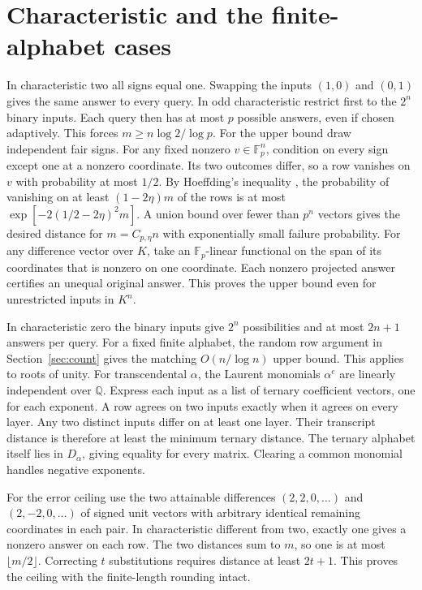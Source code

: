 \documentclass[11pt,letterpaper]{article}
\numberwithin{equation}{section}
\begin{document}
\section{Characteristic and the finite-alphabet cases}\label{sec:elementary}

In characteristic two all signs equal one. Swapping the inputs $(1,0)$ and $(0,1)$ gives the
same answer to every query. In odd characteristic restrict first to the $2^n$ binary inputs.
Each query then has at most $p$ possible answers, even if chosen adaptively. This forces $m\ge
n\log 2/\log p$. For the upper bound draw independent fair signs. For any fixed nonzero
$v\in\mathbb F_p^n$, condition on every sign except one at a nonzero coordinate. Its two
outcomes differ, so a row vanishes on $v$ with probability at most $1/2$. By Hoeffding's
inequality \cite{hoeffding}, the probability of vanishing on at least $(1-2\eta)m$ of the rows
is at most $\exp[-2(1/2-2\eta)^2m]$. A union bound over fewer than $p^n$ vectors gives the
desired distance for $m=C_{p,\eta}n$ with exponentially small failure probability. For any
difference vector over $K$, take an $\mathbb F_p$-linear functional on the span of its
coordinates that is nonzero on one coordinate. Each nonzero projected answer certifies an
unequal original answer. This proves the upper bound even for unrestricted inputs in $K^n$.

In characteristic zero the binary inputs give $2^n$ possibilities and at most $2n+1$ answers
per query. For a fixed finite alphabet, the random row argument in Section~\ref{sec:count}
gives the matching $O(n/\log n)$ upper bound. This applies to roots of unity. For
transcendental $\alpha$, the Laurent monomials $\alpha^e$ are linearly independent over
$\mathbb Q$. Express each input as a list of ternary coefficient vectors, one for each
exponent. A row agrees on two inputs exactly when it agrees on every layer. Any two distinct
inputs differ on at least one layer. Their transcript distance is therefore at least the
minimum ternary distance. The ternary alphabet itself lies in $D_\alpha$, giving equality for
every matrix. Clearing a common monomial handles negative exponents.

For the error ceiling use the two attainable differences $(2,2,0,\ldots)$ and
$(2,-2,0,\ldots)$ of signed unit vectors with arbitrary identical remaining coordinates in
each pair. In characteristic different from two, exactly one gives a nonzero answer on each
row. The two distances sum to $m$, so one is at most $\lfloor m/2\rfloor$. Correcting $t$
substitutions requires distance at least $2t+1$. This proves the ceiling with the
finite-length rounding intact.
\end{document}
